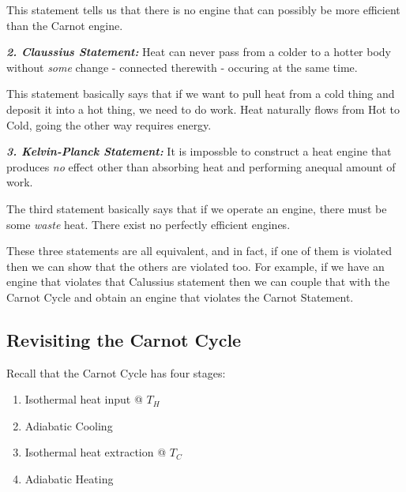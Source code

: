 \documentclass{article}
\begin{document}
This statement tells us that there is no engine that can possibly be more efficient than the Carnot engine.

\begin{dottedbox}
  \emph{\textbf{2. Claussius Statement:}} Heat can never pass from a colder to a hotter body without \emph{some} change - connected therewith - occuring at the same time.
\end{dottedbox}

This statement basically says that if we want to pull heat from a cold thing and deposit it into a hot thing, we need to do work. Heat naturally flows from Hot to Cold, going the other way requires energy.

\begin{dottedbox}
  \emph{\textbf{3. Kelvin-Planck Statement:}} It is impossble to construct a heat engine that produces \emph{no} effect other than absorbing heat and performing anequal amount of work.
\end{dottedbox}

The third statement basically says that if we operate an engine, there must be some \emph{waste} heat. There exist no perfectly efficient engines.

\vskip 0.5cm
These three statements are all equivalent, and in fact, if one of them is violated then we can show that the others are violated too. For example, if we have an engine that violates that Calussius statement then we can couple that with the Carnot Cycle and obtain an engine that violates the Carnot Statement.



\vskip 1cm
\subsection{Revisiting the Carnot Cycle}

\vskip 0.5cm
Recall that the Carnot Cycle has four stages:
\begin{enumerate}
  \item Isothermal heat input @ $T_H$
  \item Adiabatic Cooling 
  \item Isothermal heat extraction @ $T_C$
  \item Adiabatic Heating 
\end{enumerate}
\end{document}
